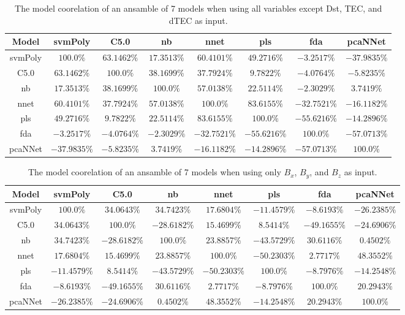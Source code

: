 \begin{table}[!ht]
	\centering
	\begin{tabular}{|c|c|c|c|c|c|c|c|}
		\hline
		Model & svmPoly & C5.0 & nb & nnet & pls & fda & pcaNNet \\ \hline
		svmPoly & $100.0\%$ & $63.1462\%$ & $17.3513\%$ & $60.4101\%$ & $49.2716\%$ & $-3.2517\%$ & $-37.9835\%$ \\ \hline
		C5.0 & $63.1462\%$ & $100.0\%$ & $38.1699\%$ & $37.7924\%$ & $9.7822\%$ & $-4.0764\%$ & $-5.8235\%$ \\ \hline
		nb & $17.3513\%$ & $38.1699\%$ & $100.0\%$ & $57.0138\%$ & $22.5114\%$ & $-2.3029\%$ & $3.7419\%$ \\ \hline
		nnet & $60.4101\%$ & $37.7924\%$ & $57.0138\%$ & $100.0\%$ & $83.6155\%$ & $-32.7521\%$ & $-16.1182\%$ \\ \hline
		pls & $49.2716\%$ & $9.7822\%$ & $22.5114\%$ & $83.6155\%$ & $100.0\%$ & $-55.6216\%$ & $-14.2896\%$ \\ \hline
		fda & $-3.2517\%$ & $-4.0764\%$ & $-2.3029\%$ & $-32.7521\%$ & $-55.6216\%$ & $100.0\%$ & $-57.0713\%$ \\ \hline
		pcaNNet & $-37.9835\%$ & $-5.8235\%$ & $3.7419\%$ & $-16.1182\%$ & $-14.2896\%$ & $-57.0713\%$ & $100.0\%$ \\ \hline
	\end{tabular}
	\caption{The model coorelation of an ansamble of 7 models when using all variables except Dst, TEC, and dTEC as input.}
	\label{tab:ansamble7:noTEC}
\end{table}

\begin{table}[!ht]
	\centering
	\begin{tabular}{|c|c|c|c|c|c|c|c|}
		\hline
		Model & svmPoly & C5.0 & nb & nnet & pls & fda & pcaNNet \\ \hline
		svmPoly & $100.0\%$ & $34.0643\%$ & $34.7423\%$ & $17.6804\%$ & $-11.4579\%$ & $-8.6193\%$ & $-26.2385\%$ \\ \hline
		C5.0 & $34.0643\%$ & $100.0\%$ & $-28.6182\%$ & $15.4699\%$ & $8.5414\%$ & $-49.1655\%$ & $-24.6906\%$ \\ \hline
		nb & $34.7423\%$ & $-28.6182\%$ & $100.0\%$ & $23.8857\%$ & $-43.5729\%$ & $30.6116\%$ & $0.4502\%$ \\ \hline
		nnet & $17.6804\%$ & $15.4699\%$ & $23.8857\%$ & $100.0\%$ & $-50.2303\%$ & $2.7717\%$ & $48.3552\%$ \\ \hline
		pls & $-11.4579\%$ & $8.5414\%$ & $-43.5729\%$ & $-50.2303\%$ & $100.0\%$ & $-8.7976\%$ & $-14.2548\%$ \\ \hline
		fda & $-8.6193\%$ & $-49.1655\%$ & $30.6116\%$ & $2.7717\%$ & $-8.7976\%$ & $100.0\%$ & $20.2943\%$ \\ \hline
		pcaNNet & $-26.2385\%$ & $-24.6906\%$ & $0.4502\%$ & $48.3552\%$ & $-14.2548\%$ & $20.2943\%$ & $100.0\%$ \\ \hline
	\end{tabular}
	\caption{The model coorelation of an ansamble of 7 models when using only $B_{x}$, $B_{y}$, and $B_{z}$ as input.}
	\label{tab:ansamble7:coord}
\end{table}

